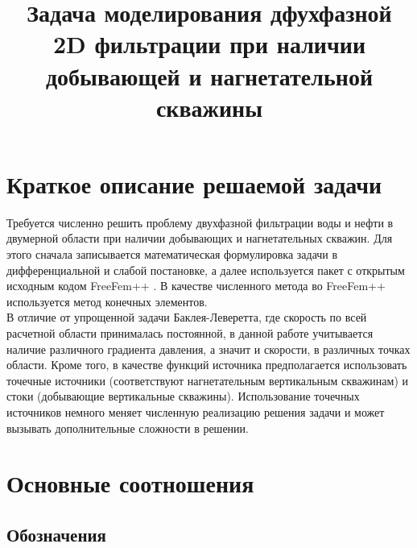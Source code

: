 







\title{Задача моделирования дфухфазной 2D фильтрации при наличии добывающей и нагнетательной скважины}
\maketitle

\newpage

\tableofcontents


\newpage


\section{Краткое описание решаемой задачи}

Требуется численно решить проблему двухфазной фильтрации воды и нефти в двумерной области при 
наличии добывающих и нагнетательных скважин. Для этого сначала записывается математическая 
формулировка задачи в дифференциальной и слабой постановке,
а далее используется пакет с открытым исходным кодом FreeFem++ \cite{MR3043640}. В качестве численного
метода во FreeFem++ используется метод конечных элементов.\\
В отличие от упрощенной задачи Баклея-Леверетта, где скорость по
всей расчетной области принималась постоянной, в данной работе учитывается 
наличие различного градиента давления, а значит и скорости, в различных точках области. Кроме того, в качестве
функций источника предполагается использовать точечные источники (соответствуют нагнетательным
вертикальным скважинам) и стоки (добывающие вертикальные скважины). Использование точечных 
источников немного меняет численную реализацию решения задачи и может вызывать дополнительные сложности в решении.

\section{Основные соотношения}

\subsection{Обозначения}

